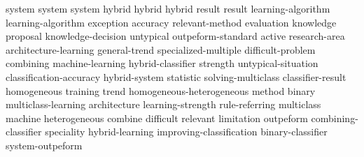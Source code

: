 system	system	system	
hybrid	hybrid	hybrid	
result	result	
learning-algorithm	learning-algorithm	
exception	
accuracy	
relevant-method	
evaluation	
knowledge	
proposal	
knowledge-decision	
untypical	
outpeform-standard	
active	
research-area	
architecture-learning	
general-trend	
specialized-multiple	
difficult-problem	
combining	
machine-learning	
hybrid-classifier	
strength	
untypical-situation	
classification-accuracy	
hybrid-system	
statistic	
solving-multiclass	
classifier-result	
homogeneous	
training	
trend	
homogeneous-heterogeneous	
method	
binary	
multiclass-learning	
architecture	
learning-strength	
rule-referring	
multiclass	
machine	
heterogeneous	
combine	
difficult	
relevant	
limitation	
outpeform	
combining-classifier	
speciality	
hybrid-learning	
improving-classification	
binary-classifier	
system-outpeform	
